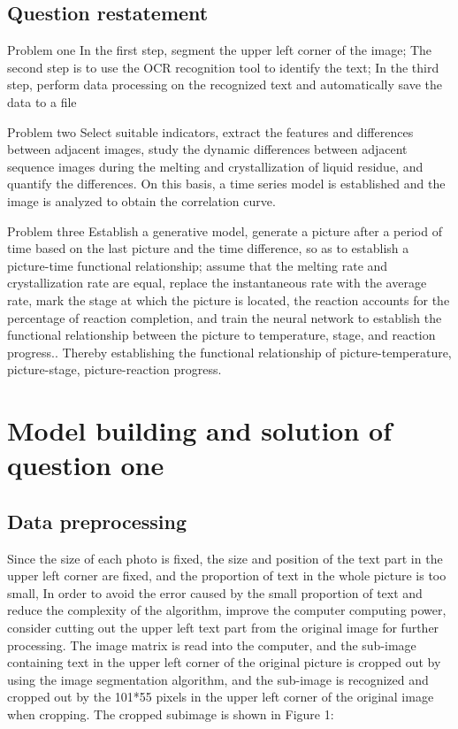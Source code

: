 \documentclass[12pt]{apmcmthesis}
\begin{document}
\subsection{Question restatement}
Problem one  In the first step, segment the upper left corner of the image; The second step is to use the OCR recognition tool to identify the text; In the third step, perform data processing on the recognized text and automatically save the data to a file

Problem two  Select suitable indicators, extract the features and differences between adjacent images, study the dynamic differences between adjacent sequence images during the melting and crystallization of liquid residue, and quantify the differences. On this basis, a time series model is established and the image is analyzed to obtain the correlation curve.

Problem three  Establish a generative model, generate a picture after a period of time based on the last picture and the time difference, so as to establish a picture-time functional relationship; assume that the melting rate and crystallization rate are equal, replace the instantaneous rate with the average rate, mark the stage at which the picture is located, the reaction accounts for the percentage of reaction completion, and train the neural network to establish the functional relationship between the picture to temperature, stage, and reaction progress.. Thereby establishing the functional relationship of picture-temperature, picture-stage, picture-reaction progress.

\section{Model building and solution of question one}

\subsection{Data preprocessing}
\setlength{\parindent}{2em} Since the size of each photo is fixed, the size and position of the text part in the upper left corner are fixed, and the proportion of text in the whole picture is too small, In order to avoid the error caused by the small proportion of text
and reduce the complexity of the algorithm, improve the computer computing power, consider cutting out the upper left text part from the original image for further processing. The image matrix is read into the computer, and the sub-image containing text in the upper left corner of the original picture is cropped out by using the image segmentation algorithm, and the sub-image is recognized and cropped out by the 101*55 pixels in the upper left corner of the original image when cropping.
The cropped subimage is shown in Figure 1:
\end{document}
